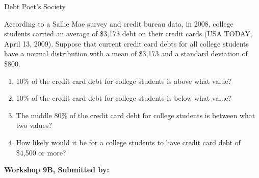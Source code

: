 \documentclass[11pt]{book}\usepackage[]{graphicx}\usepackage[]{color}
\begin{document}
\begin{exercises}
\begin{exercise}
Debt Poet’s Society

According to a Sallie Mae survey and credit bureau data, in 2008, college students carried an average of \$3,173 debt on their credit cards (USA TODAY, April 13, 2009). Suppose that current credit card debts for all college students have a normal distribution with a mean of \$3,173 and a standard deviation of \$800.

\begin{enumerate}
  \item 10\% of the credit card debt for college students is above what value?
  \item 10\% of the credit card debt for college students is below what value?
  \item The middle 80\% of the credit card debt for college students is between what two values?
  \item How likely would it be for a college students to have credit card debt of \$4,500 or more?
\end{enumerate}

\end{exercise}
\begin{solution}  %

\end{solution}

\clearpage

    \begin{exercise}  %

    \begin{center}
\begin{flushleft}\textbf{\large \hfill Workshop 9B, Submitted by: }\end{flushleft}

\end{center}


\end{exercise}
\end{exercises}
\end{document}
